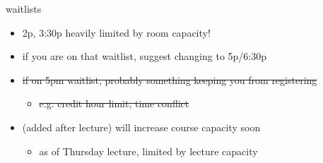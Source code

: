 \begin{frame}{waitlists}
    \begin{itemize}
    \item 2p, 3:30p heavily limited by room capacity!
    \item if you are on that waitlist, suggest changing to 5p/6:30p
    \vspace{.5cm}
    \item \sout{if on 5pm waitlist, probably something keeping you from registering}
        \begin{itemize}
        \item \sout{e.g. credit hour limit, time conflict}
        \end{itemize}
    \item (added after lecture) will increase course capacity soon
	\begin{itemize}
	\item as of Thursday lecture, limited by lecture capacity
	\end{itemize}
    \end{itemize}
\end{frame}
